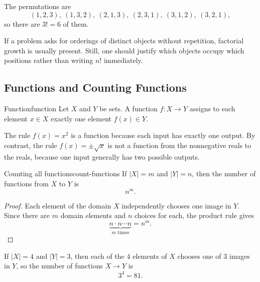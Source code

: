 \begin{examplebox}[title={Permutations of $\{1,2,3\}$}]
The permutations are
\[
(1,2,3),\ (1,3,2),\ (2,1,3),\ (2,3,1),\ (3,1,2),\ (3,2,1),
\]
so there are $3!=6$ of them.
\end{examplebox}

\begin{examtip}[title={Recognition pattern for permutations}]
If a problem asks for orderings of distinct objects without repetition, factorial growth is usually present. Still, one should justify which objects occupy which positions rather than writing $n!$ immediately.
\end{examtip}

\subsection{Functions and Counting Functions}

\begin{definition}{Function}{function}
Let $X$ and $Y$ be sets. A function $f:X\to Y$ assigns to each element $x\in X$ exactly one element $f(x)\in Y$.
\end{definition}

\begin{examplebox}[title={What is and is not a function}]
The rule $f(x)=x^2$ is a function because each input has exactly one output. By contrast, the rule $f(x)=\pm\sqrt{x}$ is not a function from the nonnegative reals to the reals, because one input generally has two possible outputs.
\end{examplebox}

\begin{theorem}{Counting all functions}{count-functions}
If $|X|=m$ and $|Y|=n$, then the number of functions from $X$ to $Y$ is
\[
n^m.
\]
\end{theorem}

\begin{proof}
Each element of the domain $X$ independently chooses one image in $Y$. Since there are $m$ domain elements and $n$ choices for each, the product rule gives
\[
\underbrace{n\cdot n\cdots n}_{m\text{ times}}=n^m.
\]
\end{proof}

\begin{examplebox}[title={A function-counting model}]
If $|X|=4$ and $|Y|=3$, then each of the $4$ elements of $X$ chooses one of $3$ images in $Y$, so the number of functions $X\to Y$ is
\[
3^4=81.
\]
\end{examplebox}

